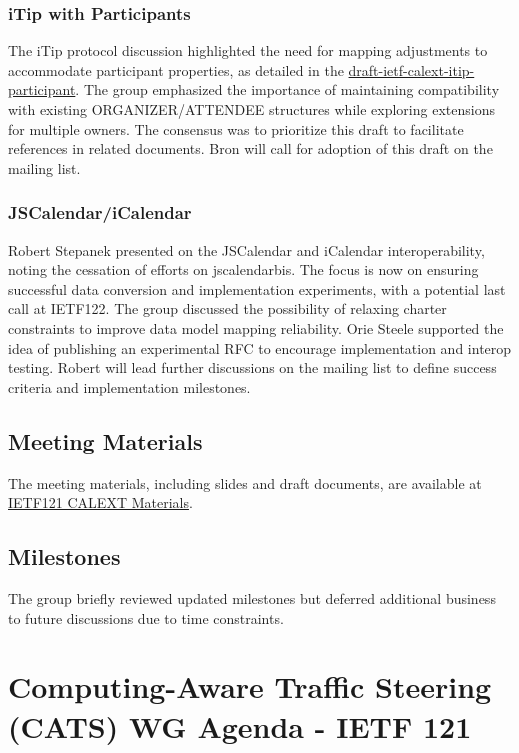\documentclass{article}
\begin{document}
\subsubsection{iTip with Participants}
The iTip protocol discussion highlighted the need for mapping adjustments to accommodate participant properties, as detailed in the \href{https://datatracker.ietf.org/doc/html/draft-ietf-calext-itip-participant}{draft-ietf-calext-itip-participant}. The group emphasized the importance of maintaining compatibility with existing ORGANIZER/ATTENDEE structures while exploring extensions for multiple owners. The consensus was to prioritize this draft to facilitate references in related documents. Bron will call for adoption of this draft on the mailing list.

\subsubsection{JSCalendar/iCalendar}
Robert Stepanek presented on the JSCalendar and iCalendar interoperability, noting the cessation of efforts on jscalendarbis. The focus is now on ensuring successful data conversion and implementation experiments, with a potential last call at IETF122. The group discussed the possibility of relaxing charter constraints to improve data model mapping reliability. Orie Steele supported the idea of publishing an experimental RFC to encourage implementation and interop testing. Robert will lead further discussions on the mailing list to define success criteria and implementation milestones.

\subsection{Meeting Materials}
The meeting materials, including slides and draft documents, are available at \href{https://datatracker.ietf.org/meeting/121/materials/agenda-121-calext}{IETF121 CALEXT Materials}.

\subsection{Milestones}
The group briefly reviewed updated milestones but deferred additional business to future discussions due to time constraints.




\newpage

\section{Computing-Aware Traffic Steering (CATS) WG Agenda - IETF 121}
\end{document}
